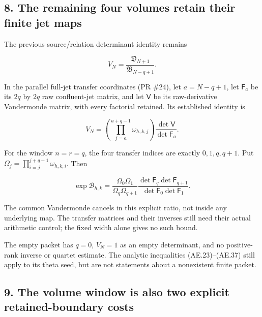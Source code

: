 \subsection*{8. The remaining four volumes retain their finite jet
maps}
\label{AE.the-remaining-four-volumes-retain-their-finite-jet-maps}

The previous source/relation determinant identity remains

\[
 V_N=\frac{\mathfrak D_{N+1}}{\mathfrak B_{N-q+1}}.
                                                                         \tag{AE.40}\label{AE.eq.40}
\]

In the parallel full-jet transfer coordinates (PR \#24), let
\(a=N-q+1\), let \(\mathsf F_a\) be its \(2q\) by \(2q\) raw
confluent-jet matrix, and let \(\mathsf V\) be its raw-derivative
Vandermonde matrix, with every factorial retained. Its established
identity is

\[
 V_N=\left(\prod_{j=a}^{a+q-1}\omega_{h,k,j}\right)
                       \frac{\det\mathsf V}{\det\mathsf F_a}.           \tag{AE.41}\label{AE.eq.41}
\]

For the window \(n=r=q\), the four transfer indices are exactly
\(0,1,q,q+1\). Put \(\Omega_j=\prod_{i=j}^{j+q-1}\omega_{h,k,i}\). Then

\[
 \boxed{
 \exp\mathcal B_{h,k}
 =\frac{\Omega_0\Omega_1}{\Omega_q\Omega_{q+1}}
   \frac{\det\mathsf F_q\det\mathsf F_{q+1}}
        {\det\mathsf F_0\det\mathsf F_1}.
 }                                                                     \tag{AE.42}\label{AE.eq.42}
\]

The common Vandermonde cancels in this explicit ratio, not inside any
underlying map. The transfer matrices and their inverses still need
their actual arithmetic control; the fixed width alone gives no such
bound.

The empty packet has \(q=0\), \(V_N=1\) as an empty determinant, and no
positive-rank inverse or quartet estimate. The analytic inequalities
(AE.23)--(AE.37) still apply to its theta seed, but are not statements about a
nonexistent finite packet.

\subsection*{9. The volume window is also two explicit retained-boundary
costs}
\label{AE.the-volume-window-is-also-two-explicit-retained-boundary-costs}

